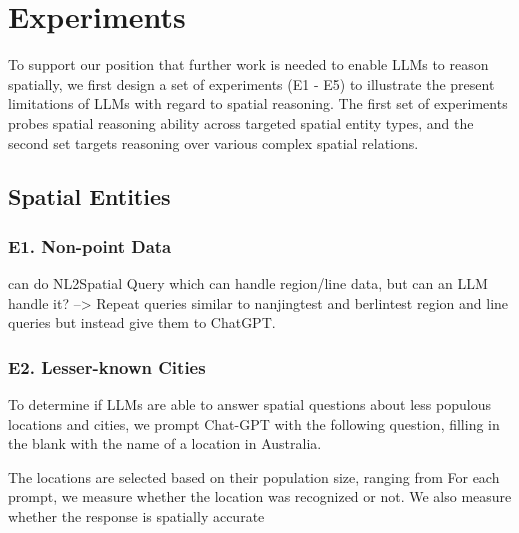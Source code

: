\section{Experiments}
\label{section:experiments}

To support our position that further work is needed to enable LLMs to reason spatially, we first design a set of experiments (E1 - E5) to illustrate the present limitations of LLMs with regard to spatial reasoning.
The first set of experiments probes spatial reasoning ability across targeted spatial entity types, and the second set targets reasoning over various complex spatial relations.


\subsection{Spatial Entities} %

\subsubsection{E1. Non-point Data}
\cite{Liu2023} can do NL2Spatial Query which can handle region/line data, but can an LLM handle it?
--> Repeat queries similar to \cite{Liu2023} nanjingtest and berlintest region and line queries but instead give them to ChatGPT.

\subsubsection{E2. Lesser-known Cities}
To determine if LLMs are able to answer spatial questions about less populous locations and cities, we prompt Chat-GPT with the following question, filling in the blank with the name of a location in Australia.

The locations are selected based on their population size, ranging from 
For each prompt, we measure whether the location was recognized or not.
We also measure whether the response is spatially accurate 





